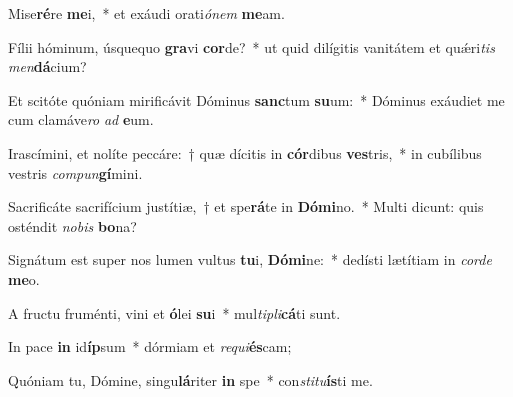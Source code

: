 \item Mise\textbf{ré}re \textbf{me}i,~* et exáudi orati\textit{ó}\textit{nem} \textbf{me}am.
\item Fílii hóminum, úsquequo \textbf{gra}vi \textbf{cor}de?~* ut quid dilígitis vanitátem et quǽri\textit{tis} \textit{men}\textbf{dá}cium?
\item Et scitóte quóniam mirificávit Dóminus \textbf{sanc}tum \textbf{su}um:~* Dóminus exáudiet me cum clamáve\textit{ro} \textit{ad} \textbf{e}um.
\item Irascímini, et nolíte peccáre:~† quæ dícitis in \textbf{cór}dibus \textbf{ves}tris,~* in cubílibus vestris \textit{com}\textit{pun}\textbf{gí}mini.
\item Sacrificáte sacrifícium justítiæ,~† et spe\textbf{rá}te in \textbf{Dó}\textbf{mi}no.~* Multi dicunt: quis osténdit \textit{no}\textit{bis} \textbf{bo}na?
\item Signátum est super nos lumen vultus \textbf{tu}i, \textbf{Dó}\textbf{mi}ne:~* dedísti lætítiam in \textit{cor}\textit{de} \textbf{me}o.
\item A fructu fruménti, vini et \textbf{ó}lei \textbf{su}i~* mul\textit{ti}\textit{pli}\textbf{cá}ti sunt.
\item In pace \textbf{in} id\textbf{íp}sum~* dórmiam et \textit{re}\textit{qui}\textbf{és}cam;
\item Quóniam tu, Dómine, singu\textbf{lá}riter \textbf{in} spe~* con\textit{sti}\textit{tu}\textbf{ís}ti me.
